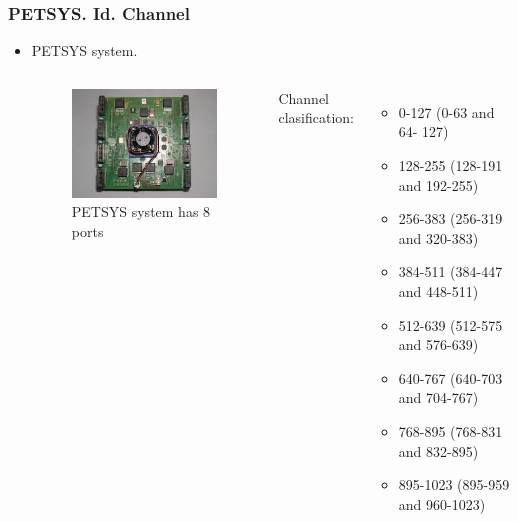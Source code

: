 \documentclass{beamer}
\begin{document}
\begin{frame}
\frametitle{PETSYS. Id. Channel}
\begin{itemize}
\item{} PETSYS system.

\begin{columns}

\begin{figure}[hbtp]
\centering
\includegraphics[scale=0.5]{PETSYS/Id_channel/8_ports.jpeg}
\caption{PETSYS system has 8 ports}
\end{figure}


Channel clasification:
\begin{itemize}
\item{} 0-127 (0-63 and 64- 127)
\item{} 128-255 (128-191 and 192-255)
\item{} 256-383 (256-319 and 320-383)
\item{} 384-511 (384-447 and 448-511)
\item{} 512-639 (512-575 and 576-639)
\item{} 640-767 (640-703 and 704-767)
\item{} 768-895 (768-831 and 832-895)
\item{} 895-1023 (895-959 and 960-1023)
\end{itemize}

\end{columns}

\end{itemize}

\end{frame}
\end{document}
